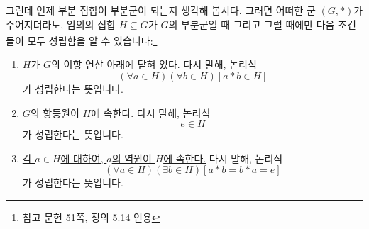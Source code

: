 \documentclass[12pt]{paper}
\begin{document}
  그런데 언제 부분 집합이 부분군이 되는지 생각해 봅시다.
  그러면 어떠한 군 $ \left( G , * \right) $가 주어지더라도, 임의의 집합 $H \subseteq G$가 $G$의 부분군일 때 그리고 그럴 때에만 다음 조건들이 모두 성립함을 알 수 있습니다:\footnote{참고 문헌 \cite{fraleigh2009} 51쪽, 정의 5.14 인용}
  \begin{enumerate}
    \item \underline{$H$가 $G$의 이항 연산 아래에 닫혀 있다.}
    다시 말해, 논리식
    \begin{equation}
      \left( \forall a \in H \right) \left( \forall b \in H \right) \left[ a * b \in H \right] \tag{7}
    \end{equation}
    가 성립한다는 뜻입니다.
    \item \underline{$G$의 항등원이 $H$에 속한다.}
    다시 말해, 논리식
    \begin{equation}
      e \in H \tag{8}
    \end{equation}
    가 성립한다는 뜻입니다.
    \item \underline{각 $a \in H$에 대하여, $a$의 역원이 $H$에 속한다.}
    다시 말해, 논리식
    \begin{equation}
      \left( \forall a \in H \right) \left( \exists b \in H \right) \left[ a * b = b * a = e \right] \tag{9}
    \end{equation}
    가 성립한다는 뜻입니다.
  \end{enumerate}
\end{document}
